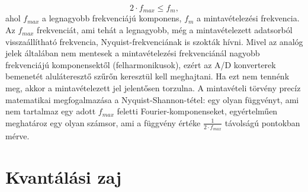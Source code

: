 \documentclass[12pt]{article}
\theoremstyle{plain}
\begin{document}
\begin{equation}
	2 \cdot f_{max} \leq f_m,
\end{equation}
ahol $f_{max}$ a legnagyobb frekvenciájú komponens, $f_m$ a mintavételezési frekvencia. Az $f_{max}$ frekvenciát, ami tehát a legnagyobb, még a mintavételezett adatsorból visszaállítható frekvencia, Nyquist-frekvenciának is szokták hívni.
Mivel az analóg jelek általában nem mentesek a mintavételezési frekvenciánál nagyobb frekvenciájú komponensektől (felharmonikusok), ezért az A/D konverterek bemenetét aluláteresztő szűrőn keresztül kell meghajtani. Ha ezt nem tennénk meg, akkor a mintavételezett jel jelentősen torzulna. A mintavételi törvény precíz matematikai megfogalmazása a Nyquist-Shannon-tétel: egy olyan függvényt, ami nem tartalmaz
egy adott $f_{max}$ feletti Fourier-komponenseket, egyértelműen meghatároz egy
olyan számsor, ami a függvény értéke $\frac{1}{2 \cdot f_{max}}$ távolságú pontokban mérve.



\section{Kvantálási zaj}
\end{document}

